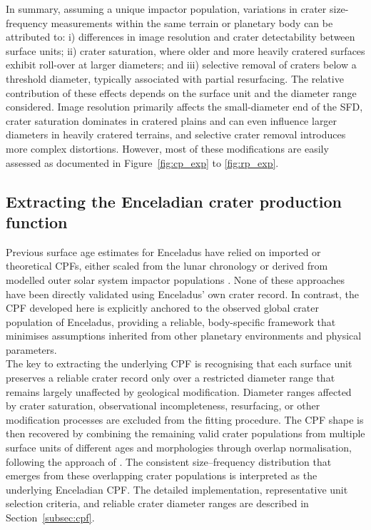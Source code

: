 \documentclass[preprint,11pt,3p,times,authoryear]{elsarticle}
\begin{document}
In summary, assuming a unique impactor population, variations in crater size-frequency measurements within the same terrain or planetary body can be attributed to: i) differences in image resolution and crater detectability between surface units; ii) crater saturation, where older and more heavily cratered surfaces exhibit roll-over at larger diameters; and iii) selective removal of craters below a threshold diameter, typically associated with partial resurfacing. 
The relative contribution of these effects depends on the surface unit and the diameter range considered. Image resolution primarily affects the small-diameter end of the SFD, crater saturation dominates in cratered plains and can even influence larger diameters in heavily cratered terrains, and selective crater removal introduces more complex distortions. However, most of these modifications are easily assessed as documented in Figure~\ref{fig:cp_exp} to \ref{fig:rp_exp}.\\

\subsection{Extracting the Enceladian crater production function} 
Previous surface age estimates for Enceladus have relied on imported or theoretical CPFs, either scaled from the lunar chronology \citep{Spencer2006} or derived from modelled outer solar system impactor populations \citep{Kirchoff2009,Wong2023,Bottke2024}. None of these approaches have been directly validated using Enceladus' own crater record. In contrast, the CPF developed here is explicitly anchored to the observed global crater population of Enceladus, providing a reliable, body-specific framework that minimises assumptions inherited from other planetary environments and physical parameters.\\

The key to extracting the underlying CPF is recognising that each surface unit preserves a reliable crater record only over a restricted diameter range that remains largely unaffected by geological modification. Diameter ranges affected by crater saturation, observational incompleteness, resurfacing, or other modification processes are excluded from the fitting procedure. The CPF shape is then recovered by combining the remaining valid crater populations from multiple surface units of different ages and morphologies through overlap normalisation, following the approach of \citet{Neukum1983}. The consistent size--frequency distribution that emerges from these overlapping crater populations is interpreted as the underlying Enceladian CPF. The detailed implementation, representative unit selection criteria, and reliable crater diameter ranges are described in Section~\ref{subsec:cpf}.\\
\end{document}
